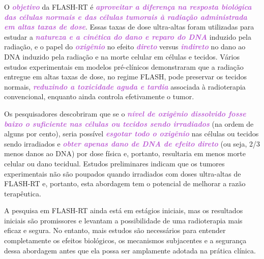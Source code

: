 \documentclass[11pt,a4paper]{article}
\begin{document}
	O \textcolor{MediumOrchid}{\textbf{\textit{objetivo}}} da FLASH-RT é \textcolor{MediumOrchid}{\textbf{\textit{aproveitar a diferença na resposta biológica das células normais e das células tumorais à radiação administrada em altas taxas de dose}}}. Essas taxas de dose ultra-altas foram utilizadas para estudar a \textcolor{MediumOrchid}{\textbf{\textit{natureza e a cinética do dano e reparo do DNA}}} induzido pela radiação, e o papel do \textcolor{MediumOrchid}{\textbf{\textit{oxigênio}}} no efeito \textcolor{MediumOrchid}{\textbf{\textit{direto}}} versus \textcolor{MediumOrchid}{\textbf{\textit{indireto}}} no dano ao DNA induzido pela radiação e na morte celular em células e tecidos. Vários estudos experimentais em modelos pré-clínicos demonstraram que a radiação entregue em altas taxas de dose, no regime FLASH, pode preservar os tecidos normais, \textcolor{MediumOrchid}{\textbf{\textit{reduzindo a toxicidade aguda e tardia}}} associada à radioterapia convencional, enquanto ainda controla efetivamente o tumor. 

	Os pesquisadores descobriram que se o \textcolor{MediumOrchid}{\textbf{\textit{nível de oxigênio dissolvido fosse baixo o suficiente nas células ou tecidos sendo irradiados}}} (na ordem de alguns por cento), seria possível \textcolor{MediumOrchid}{\textbf{\textit{esgotar todo o oxigênio}}} nas células ou tecidos sendo irradiados e \textcolor{MediumOrchid}{\textbf{\textit{obter apenas dano de DNA de efeito direto}}} (ou seja, 2/3 menos danos ao DNA) por dose física e, portanto, resultaria em menos morte celular ou dano tecidual. Estudos preliminares indicam que os tumores experimentais não são poupados quando irradiados com doses ultra-altas de FLASH-RT e, portanto, esta abordagem tem o potencial de melhorar a razão terapêutica.
	
	A pesquisa em FLASH-RT ainda está em estágios iniciais, mas os resultados iniciais são promissores e levantam a possibilidade de uma radioterapia mais eficaz e segura. No entanto, mais estudos são necessários para entender completamente os efeitos biológicos, os mecanismos subjacentes e a segurança dessa abordagem antes que ela possa ser amplamente adotada na prática clínica.
	

\end{document}
